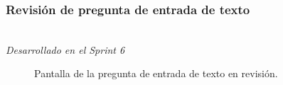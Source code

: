 \newpage

\subsubsection{Revisión de pregunta de entrada de texto}\mbox{}\\

\label{sec:pregunic1b}
\textit{Desarrollado en el Sprint 6}
\begin{figure}[H]%
  \centering
  \qquad
  \caption{Pantalla de la pregunta de entrada de texto en revisión.}%
  \label{fig:example}%
\end{figure}

